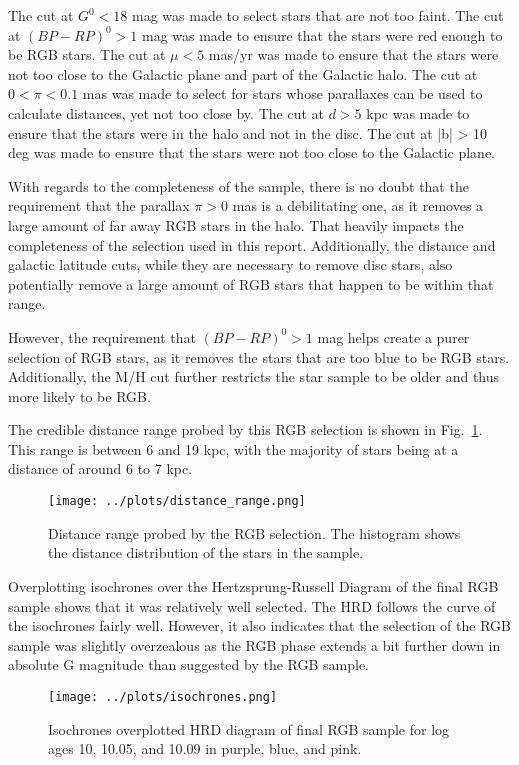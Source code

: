 \documentclass[11pt,a4paper]{article}
\begin{document}
The cut at $G^0 < 18$ mag was made to select stars that are not too faint. The cut at $(BP-RP)^0 > 1$ mag was made to ensure that the stars were red enough to be RGB stars. The cut at $\mu < 5$ mas/yr was made to ensure that the stars were not too close to the Galactic plane and part of the Galactic halo. The cut at $0 < \pi < 0.1$ mas was made to select for stars whose parallaxes can be used to calculate distances, yet not too close by. The cut at $d > 5$ kpc was made to ensure that the stars were in the halo and not in the disc. The cut at |b| > 10 deg was made to ensure that the stars were not too close to the Galactic plane.

With regards to the completeness of the sample, there is no doubt that the requirement that the parallax $\pi > 0$ mas is a debilitating one, as it removes a large amount of far away RGB stars in the halo. That heavily impacts the completeness of the selection used in this report. Additionally, the distance and galactic latitude cuts, while they are necessary to remove disc stars, also potentially remove a large amount of RGB stars that happen to be within that range. 

However, the requirement that $(BP-RP)^0 > 1$ mag helps create a purer selection of RGB stars, as it removes the stars that are too blue to be RGB stars. Additionally, the M/H cut further restricts the star sample to be older and thus more likely to be RGB.

The credible distance range probed by this RGB selection is shown in Fig.~\ref{fig:distance_range}. This range is between 6 and 19 kpc, with the majority of stars being at a distance of around 6 to 7 kpc.

\begin{figure}
    \centering
    \texttt{[image: ../plots/distance\_range.png]}
    \caption{Distance range probed by the RGB selection. The histogram shows the distance distribution of the stars in the sample.}
    \label{fig:distance_range}
\end{figure}

Overplotting isochrones over the Hertzsprung-Russell Diagram of the final RGB sample shows that it was relatively well selected. The HRD follows the curve of the isochrones fairly well. However, it also indicates that the selection of the RGB sample was slightly overzealous as the RGB phase extends a bit further down in absolute G magnitude than suggested by the RGB sample.

\begin{figure}
    \centering
    \texttt{[image: ../plots/isochrones.png]}
    \caption{Isochrones overplotted HRD diagram of final RGB sample for log ages 10, 10.05, and 10.09 in purple, blue, and pink.}
\end{figure}
\end{document}
